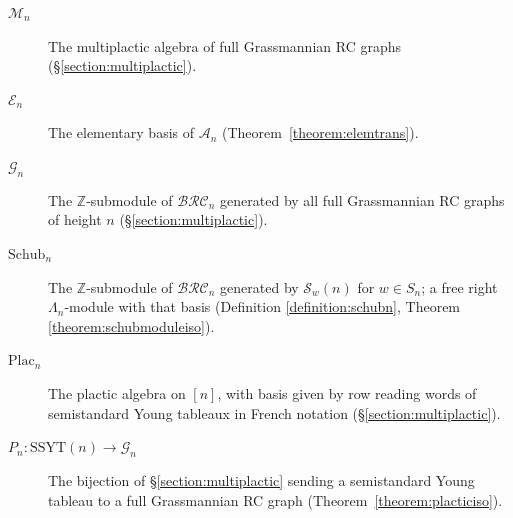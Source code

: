 \documentclass{amsart}
\theoremstyle{definition}
\theoremstyle{remark}
\numberwithin{equation}{subsection}
\newcommand{\grass}{\mathcal{G}}
\newcommand{\plac}{\mathrm{Plac}}
\newcommand{\BRC}{\mathcal{BRC}}
\newcommand{\coma}{\mathcal{A}}
\begin{document}
\begin{description}
\item[$\mathcal{M}_n$] The multiplactic algebra of full Grassmannian RC graphs (\S\ref{section:multiplactic}).
\item[$\mathcal{E}_n$] The elementary basis of $\coma_n$ (Theorem~\ref{theorem:elemtrans}).
\item[$\grass_n$] The $\mathbb{Z}$-submodule of $\BRC_n$ generated by all full Grassmannian RC graphs of height $n$ (\S\ref{section:multiplactic}).
\item[$\mathrm{Schub}_n$] The $\mathbb{Z}$-submodule of $\BRC_n$ generated by $\mathcal{S}_w(n)$ for $w\in S_n$; a free right $\Lambda_n$-module with that basis (Definition \ref{definition:schubn}, Theorem \ref{theorem:schubmoduleiso}).
\item[$\plac_n$] The plactic algebra on $[n]$, with basis given by row reading words of semistandard Young tableaux in French notation (\S\ref{section:multiplactic}).
\item[$P_n:\mathrm{SSYT}(n)\to\grass_n$] The bijection of \S\ref{section:multiplactic} sending a semistandard Young tableau to a full Grassmannian RC graph (Theorem~\ref{theorem:placticiso}).
\end{description}
\end{document}
